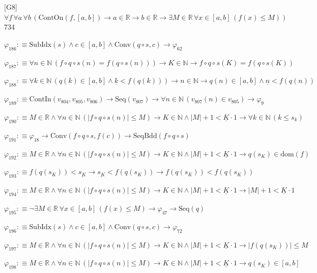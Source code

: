 \begin{fullproof}{[G8]}{$\forall f\,\forall a\,\forall b\,(\mathrm{ContOn}(f,[a,b]) \to a \in \mathbb{R} \to b \in \mathbb{R} \to \exists M \in \mathbb{R}\,\forall x \in [a,b]\,(f(x) \leq M))$}{734}
\begin{abbrevlist}
\item $\varphi_{186} :\equiv \mathrm{SubIdx}(s) \land c \in [a,b] \land \mathrm{Conv}(q \circ s,c) \to \varphi_{62}$
\item $\varphi_{187} :\equiv \forall n \in \mathbb{N}\,(f \circ q \circ s(n) = f(q \circ s(n))) \to K \in \mathbb{N} \to f \circ q \circ s(K) = f(q \circ s(K))$
\item $\varphi_{188} :\equiv \forall k \in \mathbb{N}\,(q(k) \in [a,b] \land \underline{k} < f(q(k))) \to n \in \mathbb{N} \to q(n) \in [a,b] \land \underline{n} < f(q(n))$
\item $\varphi_{189} :\equiv \mathrm{ContIn}(v_{804},v_{805},v_{806}) \to \mathrm{Seq}(v_{807}) \to \forall n \in \mathbb{N}\,(v_{807}(n) \in v_{805}) \to \varphi_{9}$
\item $\varphi_{190} :\equiv M \in \mathbb{R} \land \forall n \in \mathbb{N}\,(\lvert f \circ q \circ s(n) \rvert \leq M) \to K \in \mathbb{N} \land \lvert M \rvert + 1 < \underline{K} \cdot 1 \to \forall k \in \mathbb{N}\,(k \leq s_{k})$
\item $\varphi_{191} :\equiv \varphi_{18} \to \mathrm{Conv}(f \circ q \circ s,f(c)) \to \mathrm{SeqBdd}(f \circ q \circ s)$
\item $\varphi_{192} :\equiv M \in \mathbb{R} \land \forall n \in \mathbb{N}\,(\lvert f \circ q \circ s(n) \rvert \leq M) \to K \in \mathbb{N} \land \lvert M \rvert + 1 < \underline{K} \cdot 1 \to q(s_{K}) \in \mathrm{dom}(f)$
\item $\varphi_{193} :\equiv f(q(s_{K})) < \underline{s_{K}} \to \underline{s_{K}} < f(q(s_{K})) \to f(q(s_{K})) < f(q(s_{K}))$
\item $\varphi_{194} :\equiv M \in \mathbb{R} \land \forall n \in \mathbb{N}\,(\lvert f \circ q \circ s(n) \rvert \leq M) \to K \in \mathbb{N} \land \lvert M \rvert + 1 < \underline{K} \cdot 1 \to \lvert M \rvert + 1 < \underline{K} \cdot 1$
\item $\varphi_{195} :\equiv \neg \exists M \in \mathbb{R}\,\forall x \in [a,b]\,(f(x) \leq M) \to \varphi_{47} \to \mathrm{Seq}(q)$
\item $\varphi_{196} :\equiv \mathrm{SubIdx}(s) \land c \in [a,b] \land \mathrm{Conv}(q \circ s,c) \to \varphi_{72}$
\item $\varphi_{197} :\equiv M \in \mathbb{R} \land \forall n \in \mathbb{N}\,(\lvert f \circ q \circ s(n) \rvert \leq M) \to K \in \mathbb{N} \land \lvert M \rvert + 1 < \underline{K} \cdot 1 \to \lvert f(q(s_{K})) \rvert \leq M$
\item $\varphi_{198} :\equiv M \in \mathbb{R} \land \forall n \in \mathbb{N}\,(\lvert f \circ q \circ s(n) \rvert \leq M) \to K \in \mathbb{N} \land \lvert M \rvert + 1 < \underline{K} \cdot 1 \to q(s_{K}) \in [a,b]$

\end{abbrevlist}
\end{fullproof}
